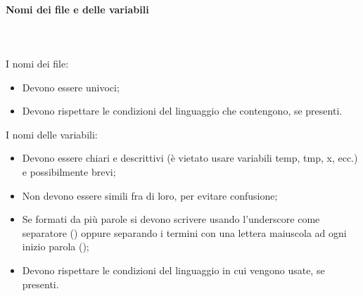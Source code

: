 \paragraph{Nomi dei file e delle variabili}\mbox{}\\ \\
I nomi dei file:
\begin{itemize}
    \item Devono essere univoci;
    \item Devono rispettare le condizioni del linguaggio che contengono, se presenti.
\end{itemize}
I nomi delle variabili:
\begin{itemize}
    \item Devono essere chiari e descrittivi (è vietato usare variabili temp, tmp, x, ecc.) e possibilmente brevi;
    \item Non devono essere simili fra di loro, per evitare confusione;
    \item Se formati da più parole si devono scrivere usando l'underscore come separatore () oppure separando i termini con una lettera maiuscola ad ogni inizio parola ();
    \item Devono rispettare le condizioni del linguaggio in cui vengono usate, se presenti.
\end{itemize}